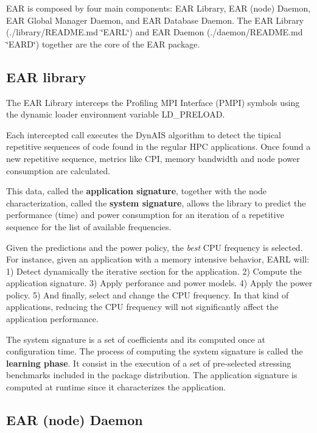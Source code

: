 E\+AR is composed by four main components\+: E\+AR Library, E\+AR (node) Daemon, E\+AR Global Manager Daemon, and E\+AR Database Daemon. The E\+AR Library (./library/\+R\+E\+A\+D\+ME.md \char`\"{}\+E\+A\+R\+L\char`\"{}) and E\+AR Daemon (./daemon/\+R\+E\+A\+D\+ME.md \char`\"{}\+E\+A\+R\+D\char`\"{}) together are the core of the E\+AR package.

\subsection*{E\+AR library}

The E\+AR Library interceps the Profiling M\+PI Interface (P\+M\+PI) symbols using the dynamic loader environment variable {\ttfamily L\+D\+\_\+\+P\+R\+E\+L\+O\+AD}.

Each intercepted call executes the Dyn\+A\+IS algorithm to detect the tipical repetitive sequences of code found in the regular H\+PC applications. Once found a new repetitive sequence, metrics like C\+PI, memory bandwidth and node power consumption are calculated.

This data, called the {\bfseries application signature}, together with the node characterization, called the {\bfseries system signature}, allows the library to predict the performance (time) and power consumption for an iteration of a repetitive sequence for the list of available frequencies.

Given the predictions and the power policy, the {\itshape best} C\+PU frequency is selected. For instance, given an application with a memory intensive behavior, E\+A\+RL will\+: 1) Detect dynamically the iterative section for the application. 2) Compute the application signature. 3) Apply perforance and power models. 4) Apply the power policy. 5) And finally, select and change the C\+PU frequency. In that kind of applications, reducing the C\+PU frequency will not significantly affect the application performance.

The system signature is a set of coefficients and it\textquotesingle{}s computed once at configuration time. The process of computing the system signature is called the {\bfseries learning phase}. It consist in the execution of a set of pre-\/selected stressing benchmarks included in the package distribution. The application signature is computed at runtime since it characterizes the application.

\subsection*{E\+AR (node) Daemon}

